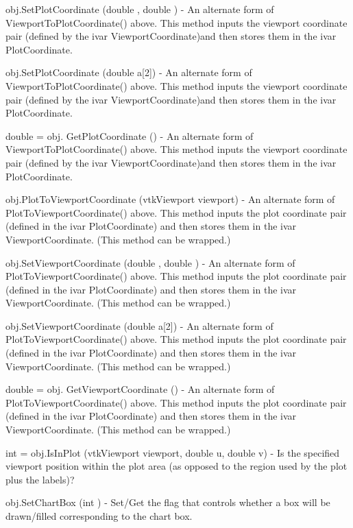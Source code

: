 \begin{DoxyItemize}
\item {\ttfamily obj.\-Set\-Plot\-Coordinate (double , double )} -\/ An alternate form of Viewport\-To\-Plot\-Coordinate() above. This method inputs the viewport coordinate pair (defined by the ivar Viewport\-Coordinate)and then stores them in the ivar Plot\-Coordinate.  
\item {\ttfamily obj.\-Set\-Plot\-Coordinate (double a\mbox{[}2\mbox{]})} -\/ An alternate form of Viewport\-To\-Plot\-Coordinate() above. This method inputs the viewport coordinate pair (defined by the ivar Viewport\-Coordinate)and then stores them in the ivar Plot\-Coordinate.  
\item {\ttfamily double = obj. Get\-Plot\-Coordinate ()} -\/ An alternate form of Viewport\-To\-Plot\-Coordinate() above. This method inputs the viewport coordinate pair (defined by the ivar Viewport\-Coordinate)and then stores them in the ivar Plot\-Coordinate.  
\item {\ttfamily obj.\-Plot\-To\-Viewport\-Coordinate (vtk\-Viewport viewport)} -\/ An alternate form of Plot\-To\-Viewport\-Coordinate() above. This method inputs the plot coordinate pair (defined in the ivar Plot\-Coordinate) and then stores them in the ivar Viewport\-Coordinate. (This method can be wrapped.)  
\item {\ttfamily obj.\-Set\-Viewport\-Coordinate (double , double )} -\/ An alternate form of Plot\-To\-Viewport\-Coordinate() above. This method inputs the plot coordinate pair (defined in the ivar Plot\-Coordinate) and then stores them in the ivar Viewport\-Coordinate. (This method can be wrapped.)  
\item {\ttfamily obj.\-Set\-Viewport\-Coordinate (double a\mbox{[}2\mbox{]})} -\/ An alternate form of Plot\-To\-Viewport\-Coordinate() above. This method inputs the plot coordinate pair (defined in the ivar Plot\-Coordinate) and then stores them in the ivar Viewport\-Coordinate. (This method can be wrapped.)  
\item {\ttfamily double = obj. Get\-Viewport\-Coordinate ()} -\/ An alternate form of Plot\-To\-Viewport\-Coordinate() above. This method inputs the plot coordinate pair (defined in the ivar Plot\-Coordinate) and then stores them in the ivar Viewport\-Coordinate. (This method can be wrapped.)  
\item {\ttfamily int = obj.\-Is\-In\-Plot (vtk\-Viewport viewport, double u, double v)} -\/ Is the specified viewport position within the plot area (as opposed to the region used by the plot plus the labels)?  
\item {\ttfamily obj.\-Set\-Chart\-Box (int )} -\/ Set/\-Get the flag that controls whether a box will be drawn/filled corresponding to the chart box.  

\end{DoxyItemize}
